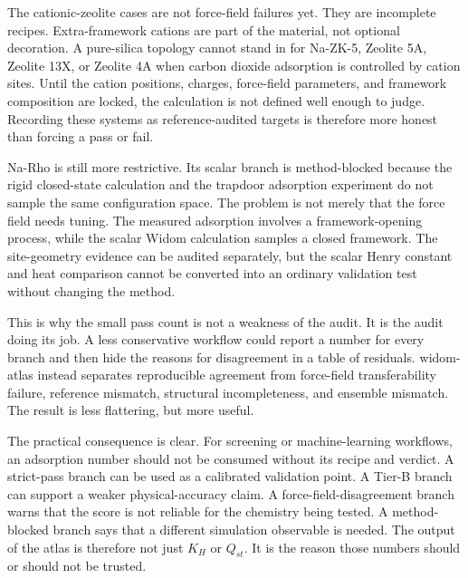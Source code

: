 The cationic-zeolite cases are not force-field failures yet. They are incomplete recipes. Extra-framework cations are part of the material, not optional decoration. A pure-silica topology cannot stand in for Na-ZK-5, Zeolite 5A, Zeolite 13X, or Zeolite 4A when carbon dioxide adsorption is controlled by cation sites. Until the cation positions, charges, force-field parameters, and framework composition are locked, the calculation is not defined well enough to judge. Recording these systems as reference-audited targets is therefore more honest than forcing a pass or fail.

Na-Rho is still more restrictive. Its scalar branch is method-blocked because the rigid closed-state calculation and the trapdoor adsorption experiment do not sample the same configuration space. The problem is not merely that the force field needs tuning. The measured adsorption involves a framework-opening process, while the scalar Widom calculation samples a closed framework. The site-geometry evidence can be audited separately, but the scalar Henry constant and heat comparison cannot be converted into an ordinary validation test without changing the method.

This is why the small pass count is not a weakness of the audit. It is the audit doing its job. A less conservative workflow could report a number for every branch and then hide the reasons for disagreement in a table of residuals. widom-atlas instead separates reproducible agreement from force-field transferability failure, reference mismatch, structural incompleteness, and ensemble mismatch. The result is less flattering, but more useful.

The practical consequence is clear. For screening or machine-learning workflows, an adsorption number should not be consumed without its recipe and verdict. A strict-pass branch can be used as a calibrated validation point. A Tier-B branch can support a weaker physical-accuracy claim. A force-field-disagreement branch warns that the score is not reliable for the chemistry being tested. A method-blocked branch says that a different simulation observable is needed. The output of the atlas is therefore not just \(K_H\) or \(Q_{st}\). It is the reason those numbers should or should not be trusted.
